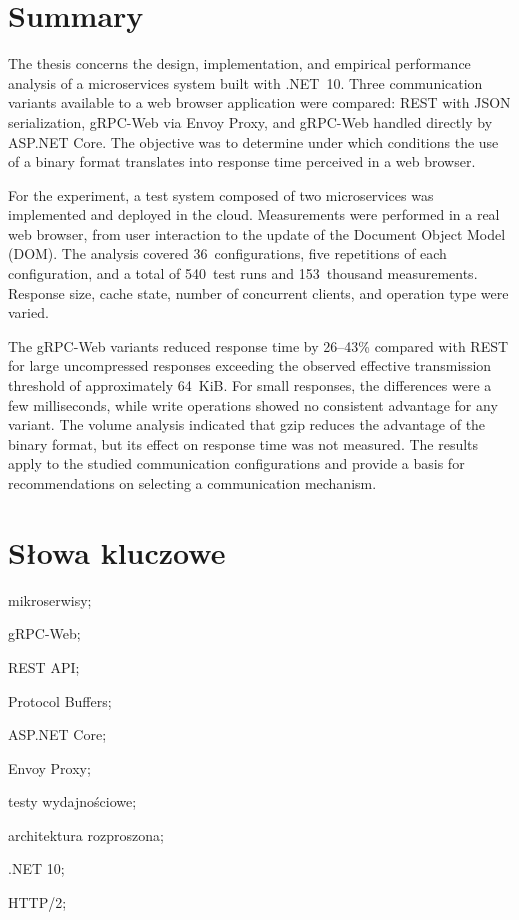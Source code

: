 \documentclass{PracaDyplomowa}
\begin{document}
\chapter*{Summary}

The thesis concerns the design, implementation, and empirical performance analysis of a microservices system built with .NET~10. Three communication variants available to a web browser application were compared: REST with JSON serialization, gRPC-Web via Envoy Proxy, and gRPC-Web handled directly by ASP.NET Core. The objective was to determine under which conditions the use of a binary format translates into response time perceived in a web browser.

For the experiment, a test system composed of two microservices was implemented and deployed in the cloud. Measurements were performed in a real web browser, from user interaction to the update of the Document Object Model (DOM). The analysis covered 36~configurations, five repetitions of each configuration, and a total of 540~test runs and 153~thousand measurements. Response size, cache state, number of concurrent clients, and operation type were varied.

The gRPC-Web variants reduced response time by 26--43\% compared with REST for large uncompressed responses exceeding the observed effective transmission threshold of approximately 64~KiB. For small responses, the differences were a few milliseconds, while write operations showed no consistent advantage for any variant. The volume analysis indicated that gzip reduces the advantage of the binary format, but its effect on response time was not measured. The results apply to the studied communication configurations and provide a basis for recommendations on selecting a communication mechanism.

\chapter*{Słowa kluczowe}

\noindent mikroserwisy;

\noindent gRPC-Web;

\noindent REST API;

\noindent Protocol Buffers;

\noindent ASP.NET Core;

\noindent Envoy Proxy;

\noindent testy wydajnościowe;

\noindent architektura rozproszona;

\noindent .NET 10;

\noindent HTTP/2;
\end{document}
